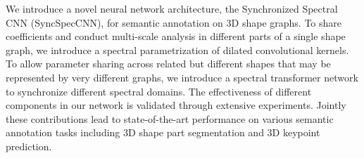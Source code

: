 \label{sec:conclusion}
We introduce a novel neural network architecture, the Synchronized Spectral CNN (SyncSpecCNN), for semantic annotation on 3D shape graphs. To share coefficients and conduct multi-scale analysis in different parts of a single shape graph, we introduce a spectral parametrization of dilated convolutional kernels. To allow parameter sharing across related but different shapes that may be represented by very different graphs, we introduce a spectral transformer network to synchronize different spectral domains. The effectiveness of different components in our network is validated through extensive experiments. Jointly these contributions lead to state-of-the-art performance on various semantic annotation tasks including 3D shape part segmentation and 3D keypoint prediction.